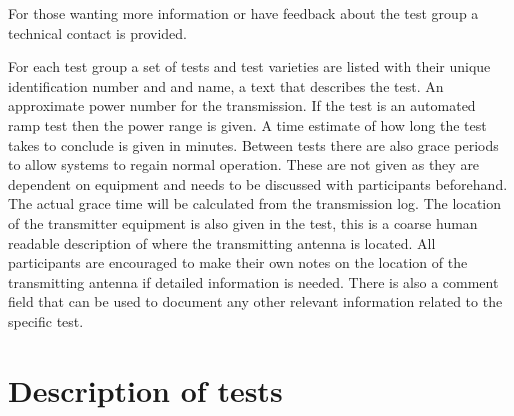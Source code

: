 \documentclass{book}
\begin{document}
For those wanting more information or have feedback about the test group a technical contact is provided. 

For each test group a set of tests and test varieties are listed with their unique identification number and and name, a text that describes the test. An approximate power number for the transmission. If the test is an automated ramp test then the power range is given. A time estimate of how long the test takes to conclude is given in minutes. Between tests there are also grace periods to allow systems to regain normal operation. These are not given as they are dependent on equipment and needs to be discussed with participants beforehand. The actual grace time will be calculated from the transmission log. The location of the transmitter equipment is also given in the test, this is a coarse human readable description of where the transmitting antenna is located. All participants are encouraged to make their own notes on the location of the transmitting antenna if detailed information is needed. There is also a comment field that can be used to document any other relevant information related to the specific test. 

\chapter{Description of tests}

\end{document}
